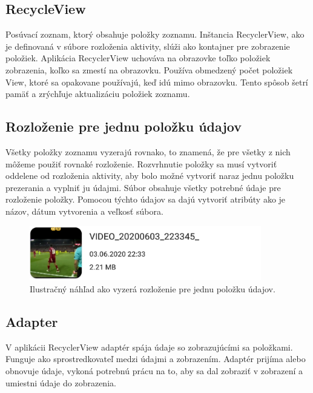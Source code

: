 \documentclass[12pt, oneside]{book}
\begin{document}
\subsection{RecycleView}
\label{sec:recycleView}

\hspace{15pt} Posúvací zoznam, ktorý obsahuje položky zoznamu. Inštancia RecyclerView, ako je definovaná v súbore rozloženia aktivity, slúži ako kontajner pre zobrazenie položiek. Aplikácia RecyclerView uchováva na obrazovke toľko položiek zobrazenia, koľko sa zmestí na obrazovku. Používa obmedzený počet položiek View, ktoré sa opakovane používajú, keď idú mimo obrazovku. Tento spôsob šetrí pamäť a zrýchľuje aktualizáciu položiek zoznamu.

\subsection{Rozloženie pre jednu položku údajov}

\hspace{15pt} Všetky položky zoznamu vyzerajú rovnako, to znamená, že pre všetky z nich môžeme použiť rovnaké rozloženie. Rozvrhnutie položky sa musí vytvoriť oddelene od rozloženia aktivity, aby bolo možné vytvoriť naraz jednu položku prezerania a vyplniť ju údajmi. Súbor obsahuje všetky potrebné údaje pre rozloženie položky. Pomocou týchto údajov sa dajú vytvoriť atribúty ako je názov, dátum vytvorenia a veľkosť súbora.

\begin{figure}[h]
    \centering
    \includegraphics[width=0.9\textwidth]{images/polozka.jpg}
    \caption{Ilustračný náhľad ako vyzerá rozloženie pre jednu položku údajov. }
    \label{fig:obr08}
\end{figure}

\subsection{Adapter}

\hspace{15pt} V aplikácii RecyclerView adaptér spája údaje so zobrazujúcími sa položkami. Funguje ako sprostredkovateľ medzi údajmi a zobrazením. Adaptér prijíma alebo obnovuje údaje, vykoná potrebnú prácu na to, aby sa dal zobraziť v zobrazení a umiestni údaje do zobrazenia.
\end{document}
